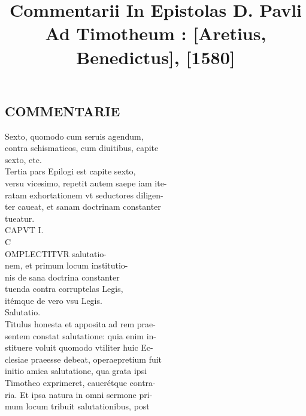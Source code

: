 \documentclass{article}
\begin{document}
\date{}
        \title{Commentarii In Epistolas D. Pavli Ad Timotheum : [Aretius, Benedictus], [1580]}
\maketitle

\begin{pages} 
\beginnumbering
        
\section*{COMMENTARIE \\
                }Sexto, quomodo cum seruis agendum, \\
                contra schismaticos, cum diuitibus, capite \\
                sexto, etc. \\
                Tertia pars Epilogi est capite sexto, \\
                versu vicesimo, repetit autem saepe iam ite- \\
                ratam exhortationem vt seductores diligen- \\
                ter caueat, et sanam doctrinam constanter \\
                tueatur. \\
                CAPVT I. \\
                C \\
                OMPLECTITVR salutatio- \\
                nem, et primum locum institutio- \\
                nis de sana doctrina constanter \\
                tuenda contra corruptelas Legis, \\
                itémque de vero vsu Legis. \\
                Salutatio. \\
                Titulus honesta et apposita ad rem prae- \\
                sentem constat salutatione: quia enim in- \\
                stituere voluit quomodo vtiliter huic Ec- \\
                clesiae praeesse debeat, operaepretium fuit \\
                initio amica salutatione, qua grata ipsi \\
                Timotheo exprimeret, cauerétque contra- \\
                ria. Et ipsa natura in omni sermone pri- \\
                mum locum tribuit salutationibus, post \\
                

\end{pages}
\end{document}
